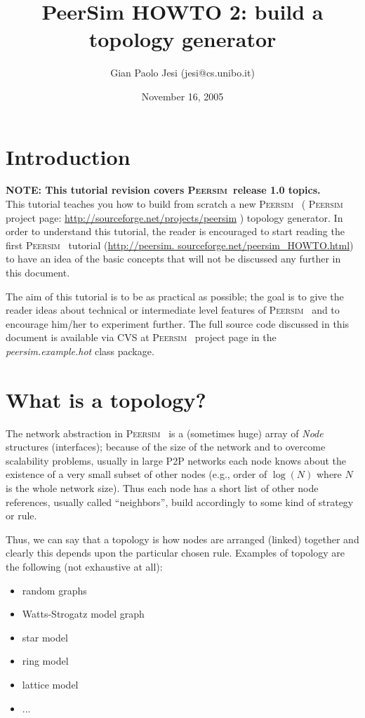 \documentclass[a4paper,12pt]{article}
\title{PeerSim HOWTO 2: build a topology generator}
\author{Gian Paolo Jesi (jesi@cs.unibo.it)}
\date{November 16, 2005}
\newcommand{\id}[1]{{\scshape\small #1}}
\newcommand{\psim}{\id{Peersim}}
\begin{document}
\maketitle

\section{Introduction}

\textbf{NOTE: This tutorial revision covers \psim~release 1.0
  topics.}\\

This tutorial teaches you how to build from scratch a new \psim~
( \psim~ project page: \url{http://sourceforge.net/projects/peersim}
) topology generator. In order to understand this tutorial, the reader
is encouraged to start reading the first \psim~ tutorial 
(\url{http://peersim. sourceforge.net/peersim_HOWTO.html}) 
to have an idea of the basic concepts that will not be discussed any
further in this document. 

The aim of this tutorial is to be as practical as possible; the goal
is to give the reader ideas about technical or intermediate level
features of \psim~ and to encourage him/her to experiment further.
The full source code discussed in this document is available via CVS
at \psim~ project page in the \emph{peersim.example.hot} class package.


\section{What is a topology?}

The network abstraction in \psim~ is a (sometimes huge) array of
\emph{Node} structures (interfaces); because of the size of the network
and to overcome scalability problems, usually in large P2P networks
each node knows about the existence of a very small subset of other
nodes (e.g., order of $\log(N)$ where $N$ is the whole network size). Thus
each node has a short list of other node references, usually called
``neighbors'', build accordingly to some kind of strategy
or rule. 

Thus, we can say that a topology is how nodes are arranged (linked)
together and clearly this depends upon the particular chosen rule.
Examples of topology are the following (not exhaustive at all): 

\begin{itemize}
\item random graphs 
\item Watts-Strogatz model graph 
\item star model 
\item ring model 
\item lattice model 
\item ...
\end{itemize}
\end{document}
